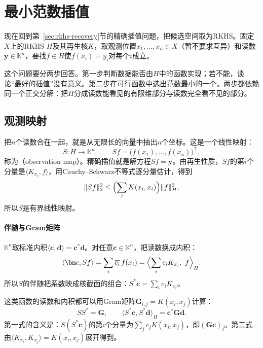 \section{最小范数插值}
\label{sec:rkhs-min-norm-interpolation}

现在回到第~\ref{sec:rkhs-recovery}节的精确插值问题，把候选空间取为RKHS。固定$X$上的RKHS $H$及其再生核$K$，取观测位置$x_1,\ldots,x_n\in X$（暂不要求互异）和读数$\bm y\in\mathbb K^n$，要找$f\in H$使$f(x_i)=y_i$对每个$i$成立。

这个问题要分两步回答。第一步判断数据能否由$H$中的函数实现；若不能，谈论“最好的插值”没有意义。第二步在可行函数中选出范数最小的一个。两步都依赖同一个正交分解：把$H$分成读数能看见的有限维部分与读数完全看不见的部分。

\subsection{观测映射}
\label{sec:rkhs-observation-map}

把$n$个读数合在一起，就是从无限长的向量中抽出$n$个坐标。这是一个线性映射：
\begin{equation}
S:H\to\mathbb K^n,\qquad Sf=\bigl(f(x_1),\ldots,f(x_n)\bigr)^{\top},
\label{eq:rkhs-observation-map}
\end{equation}
称为（observation map）。精确插值就是解方程$Sf=\bm y$。由再生性质，$Sf$的第$i$个分量是$\langle K_{x_i},f\rangle$，用Cauchy--Schwarz不等式逐分量估计，得到
\[
\lVert Sf\rVert_2^2\leq\Bigl(\sum_iK(x_i,x_i)\Bigr)\lVert f\rVert_H^2 ,
\]
所以$S$是有界线性映射。

\paragraph{伴随与Gram矩阵}

$\mathbb K^n$取标准内积$\langle\bm c,\bm d\rangle=\bm c^*\bm d$。对任意$\bm c\in\mathbb K^n$，把读数换成内积：
\[
\langle\bm c,Sf\rangle=\sum_i\overline{c_i}\,f(x_i)=\Bigl\langle\sum_ic_iK_{x_i},\ f\Bigr\rangle_H .
\]
所以$S$的伴随把系数映成核截面的组合：$S^*\bm c=\sum_ic_iK_{x_i}$。

这类函数的读数和内积都可以用Gram矩阵$\bm G_{i,j}=K(x_i,x_j)$计算：
\begin{equation}
SS^*=\bm G,\qquad
\langle S^*\bm c,S^*\bm d\rangle_H=\bm c^*\bm G\bm d .
\label{eq:rkhs-gram-calculus}
\end{equation}
第一式的含义是：$S(S^*\bm c)$的第$i$个分量为$\sum_jc_jK(x_i,x_j)$，即$(\bm G\bm c)_i$。第二式由$\langle K_{x_i},K_{x_j}\rangle=K(x_i,x_j)$展开得到。

